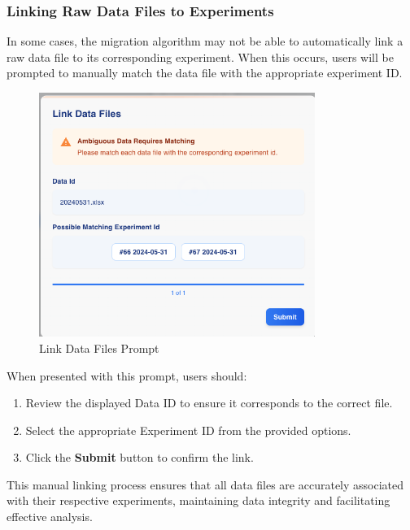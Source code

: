 \documentclass[12pt]{article}
\begin{document}
\subsubsection{Linking Raw Data Files to Experiments}

In some cases, the migration algorithm may not be able to automatically link a
raw data file to its corresponding experiment. When this occurs, users will be
prompted to manually match the data file with the appropriate experiment ID.

\begin{figure}[H]
    \centering
    \includegraphics[width=0.8\textwidth]{./Diagrams/DataLinkModal.png}
    \caption{Link Data Files Prompt}
\end{figure}

When presented with this prompt, users should:

\begin{enumerate}
    \item Review the displayed Data ID to ensure it corresponds to the correct
    file.
    \item Select the appropriate Experiment ID from the provided options.
    \item Click the \textbf{Submit} button to confirm the link.
\end{enumerate}

This manual linking process ensures that all data files are accurately
associated with their respective experiments, maintaining data integrity and
facilitating effective analysis.
\end{document}
